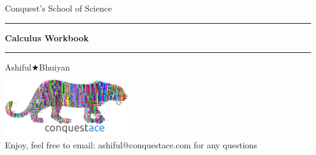 \begin{titlepage}
    \begin{center}
        \vspace*{2cm}
        
        {\Large Conquest's School of Science} \\[1.5cm]
        
        \hrule
        \vspace{1cm}
        
        {\Huge \textbf{Calculus Workbook}} \\[1cm]
        
        \hrule
        \vspace{1.5cm}
         \Large {Ashiful\(\bigstar\)Bhuiyan}\\ [1.5 cm]

 

        \includegraphics[width=0.4\textwidth]{logo.png} \\[1cm]


        \vfill
        {\large Enjoy, feel free to email: ashiful@conquestace.com for any questions} \\[1cm]
    \end{center}
\end{titlepage}